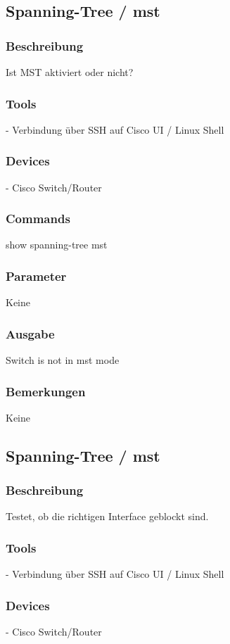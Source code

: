 \documentclass[a4,12pt]{scrartcl}
\begin{document}
\subsection{Spanning-Tree / mst}
\subsubsection{Beschreibung}
Ist MST aktiviert oder nicht?
\subsubsection{Tools}
- Verbindung über SSH auf Cisco UI / Linux Shell
\subsubsection{Devices}
- Cisco Switch/Router
\subsubsection{Commands}
show spanning-tree mst
\subsubsection{Parameter}
Keine
\subsubsection{Ausgabe}
Switch is not in mst mode
\subsubsection{Bemerkungen}
Keine



\subsection{Spanning-Tree / mst}
\subsubsection{Beschreibung}
Testet, ob die richtigen Interface geblockt sind.
\subsubsection{Tools}
- Verbindung über SSH auf Cisco UI / Linux Shell
\subsubsection{Devices}
- Cisco Switch/Router
\end{document}
